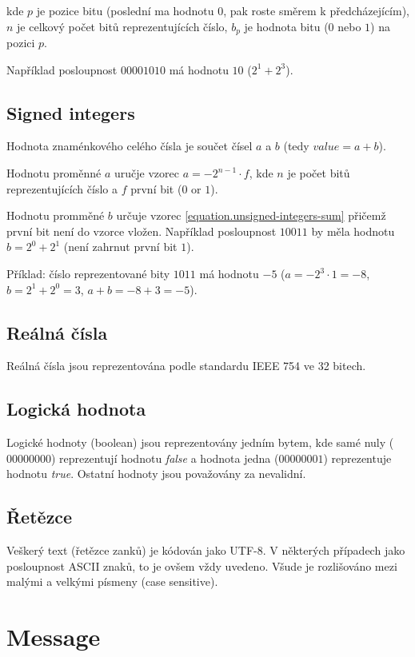 \documentclass[12pt,oneside,a4paper]{report}
\begin{document}
kde $p$ je pozice bitu (poslední ma hodnotu $0$, pak roste směrem k předcházejícím), $n$ je celkový počet bitů reprezentujících číslo, $b_p$ je hodnota bitu ($0$ nebo $1$) na pozici $p$.

Například posloupnost $00001010$ má hodnotu $10$ ($2^1 + 2^3$).

\subsection{Signed integers}

Hodnota znaménkového celého čísla je součet čísel $a$ a $b$ (tedy ${value} = a + b$). 

Hodnotu proměnné $a$ uručje vzorec $a = -2^{n - 1} \cdot f$, kde $n$ je počet bitů reprezentujících číslo a $f$ první bit ($0$ or $1$).

Hodnotu promměné $b$ určuje vzorec \ref{equation.unsigned-integers-sum} přičemž první bit není do vzorce vložen. Například posloupnost $10011$ by měla hodnotu $b = 2^0 + 2^1$ (není zahrnut první bit $1$).

Příklad: číslo reprezentované bity $1011$ má hodnotu $-5$ ($a = -2^3 \cdot 1 = -8$, $b = 2^1 + 2^0 = 3$, $a + b = -8 + 3 = -5$).

\subsection{Reálná čísla}

Reálná čísla jsou reprezentována podle standardu IEEE 754 ve 32 bitech.

\subsection{Logická hodnota} 

Logické hodnoty (boolean) jsou reprezentovány jedním bytem, kde samé nuly ($00000000$) reprezentují hodnotu \emph{false} a hodnota jedna ($00000001$) reprezentuje hodnotu \emph{true}. Ostatní hodnoty jsou považovány za nevalidní.

\subsection{Řetězce}

Veškerý text (řetězce zanků) je kódován jako UTF-8. V některých případech jako posloupnost ASCII znaků, to je ovšem vždy uvedeno. Všude je rozlišováno mezi malými a velkými písmeny (case sensitive).

\section{Message}
\end{document}
